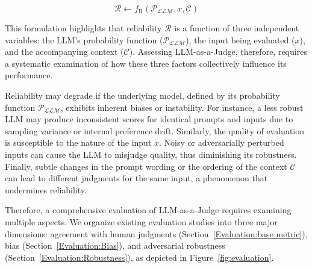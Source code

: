 \documentclass[acmsmall,screen]{acmart}
\newcommand{\jw}[1]{\textcolor{blue}{#1}}
\begin{document}
\[
\mathcal{R} \leftarrow f_{\text{R}}\left(\mathcal{P}_{\mathcal{LLM}}, x, \mathcal{C}\right)
\]

This formulation highlights that reliability $\mathcal{R}$ is a function of three independent variables: the LLM's probability function ($\mathcal{P}_{\mathcal{LLM}}$), the input being evaluated ($x$), and the accompanying context ($\mathcal{C}$). Assessing LLM-as-a-Judge, therefore, requires a systematic examination of how these three factors collectively influence its performance.

Reliability may degrade if the underlying model, defined by its probability function $\mathcal{P}_{\mathcal{LLM}}$, exhibits inherent biases or instability. For instance, a less robust LLM may produce inconsistent scores for identical prompts and inputs due to sampling variance or internal preference drift. Similarly, the quality of evaluation is susceptible to the nature of the input $x$. Noisy or adversarially perturbed inputs can cause the LLM to misjudge quality, thus diminishing its robustness. Finally, subtle changes in the prompt wording or the ordering of the context $\mathcal{C}$ can lead to different judgments for the same input, a phenomenon that undermines reliability.


Therefore, a comprehensive evaluation of LLM-as-a-Judge requires examining multiple aspects. 
We organize existing evaluation studies into three major dimensions: agreement with human judgments (Section~\ref{Evaluation:base metric}), bias (Section~\ref{Evaluation:Bias}), and adversarial robustness (Section~\ref{Evaluation:Robustness}), as depicted in Figure~\ref{fig:evaluation}.


%         
\end{document}
